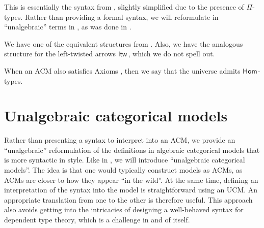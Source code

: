 This is essentially the syntax from \cite{north2019},
slightly simplified due to the presence of $\Pi$-types.
Rather than providing a formal syntax,
we will reformulate 
in ``unalgebraic'' terms in ,
as was done in .

\begin{axiom}\label{ax:hom-elimination}
  We have one of the equivalent structures from .
  Also, we have the analogous structure for the left-twisted arrows $\ltw$,
  which we do not spell out.
\end{axiom}


\begin{definition}\label{def:ACM-universe-hom}
  When an ACM also satisfies Axioms
  ,
  then we say that the universe admits $\mathsf{Hom}$-types.
\end{definition}

\section{Unalgebraic categorical models}

Rather than presenting a syntax to interpret into an ACM,
we provide an ``unalgebraic'' reformulation of the definitions in algebraic categorical models
that is more syntactic in style.
Like in ,
we will introduce ``unalgebraic categorical models''.
The idea is that one would typically construct models as ACMs,
as ACMs are closer to how they appear ``in the wild''.
At the same time, defining an interpretation of the syntax into the model
is straightforward using an UCM.
An appropriate translation from one to the other is therefore useful.
This approach also avoids getting into the intricacies of designing a well-behaved syntax
for dependent type theory,
which is a challenge in and of itself.

